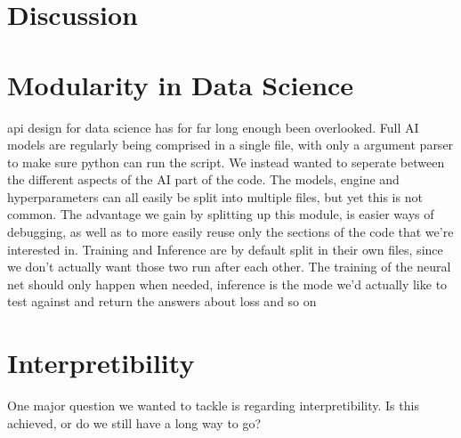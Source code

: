 \section{Discussion}
\label{chap:discussion}

\section{Modularity in Data Science}

api design for data science has for far long enough been overlooked. Full AI models are regularly being comprised in a single file, with only a argument parser to make sure python can run the script. We instead wanted to seperate between the different aspects of the AI part of the code. The models, engine and hyperparameters can all easily be split into multiple files, but yet this is not common. The advantage we gain by splitting up this module, is easier ways of debugging, as well as to more easily reuse only the sections of the code that we're interested in. Training and Inference are by default split in their own files, since we don't actually want those two run after each other. The training of the neural net should only happen when needed, inference is the mode we'd actually like to test against and return the answers about loss and so on 


\section{Interpretibility}
One major question we wanted to tackle is regarding interpretibility. Is this achieved, or do we still have a long way to go?